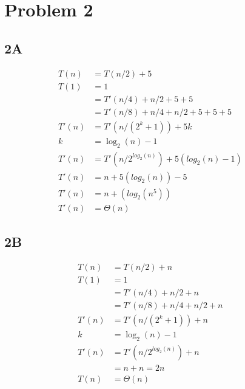 \documentclass[14pt]{extarticle}
\begin{document}
\section*{Problem 2}


\subsection*{2A}
\begin{align*}
T(n) &= T(n/2) + 5  && \text{}  \\
T(1) &= 1 && \text{} \\
&= T'(n/4) + n/2 + 5 + 5 \\
&= T'(n/8) + n/4 + n/2 + 5 + 5 + 5\\
T'(n) &= T'(n/(2^k+1)) + 5k\\ 
k &= \log_2(n) - 1 \\
T'(n) &= T'(n/2^{log_2(n)}) + 5(log_2(n) - 1) \\
T'(n) &= n + 5(log_2(n)) - 5 \\
T'(n) &= n + (log_2(n^5)) \\
T'(n) &= \Theta(n)
\end{align*} 
\subsection*{2B}
\begin{align*}
T(n) &= T(n/2) + n  && \text{}  \\
T(1) &= 1 && \text{} \\
&= T'(n/4) + n/2 + n \\
&= T'(n/8) + n/4 + n/2 + n \\
T'(n) &= T'(n/(2^k+1)) + n \\ 
k &= \log_2(n) - 1 \\
T'(n) &= T'(n/2^{log_2(n)}) + n \\
 &= n + n = 2n \\
 T(n) &= \Theta(n)
\end{align*} 
\end{document}
